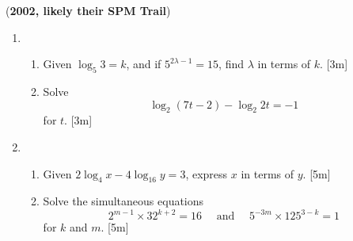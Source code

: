 \documentclass[notoc,notitlepage]{tufte-book}
\begin{document}
(\textbf{2002, likely their SPM Trail})
\begin{enumerate}
  \item 
    \begin{enumerate}
      \item Given $\log_5 3 = k$, and if $5^{2 \lambda - 1} = 15$, find
        $\lambda$ in terms of $k$. [3m]
      \item Solve
        \begin{equation*}
          \log_2 (7t - 2) - \log_2 2t = -1
        \end{equation*}
        for $t$. [3m]
    \end{enumerate}

  \item 
    \begin{enumerate}
      \item Given $2 \log_4 x - 4 \log_{16} y = 3$, express $x$ in terms of $y$.
        [5m]

      \item Solve the simultaneous equations
        \begin{equation*}
          2^{m - 1} \times 32^{k + 2} = 16 \quad\text{ and }\quad
          5^{-3m} \times 125^{3 - k} = 1
        \end{equation*}
        for $k$ and $m$. [5m]
    \end{enumerate}
\end{enumerate}

\end{document}
